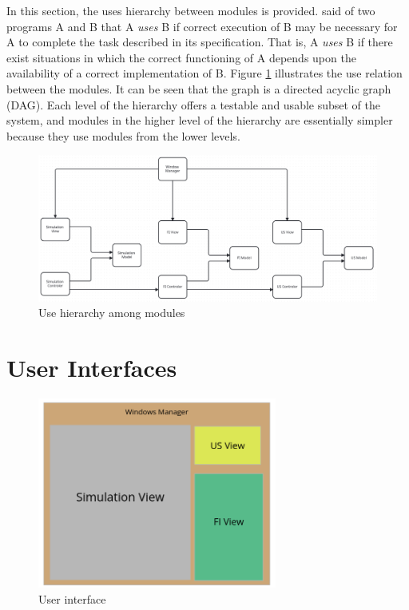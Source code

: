 \documentclass[12pt, titlepage]{article}
\begin{document}
In this section, the uses hierarchy between modules is
provided. \citet{Parnas1978} said of two programs A and B that A {\em uses} B if
correct execution of B may be necessary for A to complete the task described in
its specification. That is, A {\em uses} B if there exist situations in which
the correct functioning of A depends upon the availability of a correct
implementation of B.  Figure \ref{FigUH} illustrates the use relation between
the modules. It can be seen that the graph is a directed acyclic graph
(DAG). Each level of the hierarchy offers a testable and usable subset of the
system, and modules in the higher level of the hierarchy are essentially simpler
because they use modules from the lower levels.
\begin{figure}[H]
\centering
\includegraphics[width=1\textwidth]{UsesHierarchy.png}
\caption{Use hierarchy among modules}
\label{FigUH}
\end{figure}

\section{User Interfaces}

\begin{figure}[H]
  \centering
  \includegraphics[width=0.7\textwidth]{UI.png}
  \caption{User interface}
  \label{FigUI}
  \end{figure}
\end{document}
